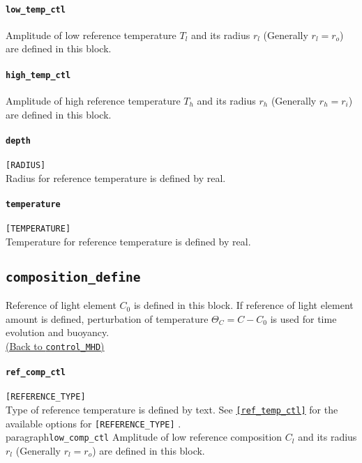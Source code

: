 \paragraph{\tt low\_temp\_ctl}
\label{href_t:low_temp_ctl}
Amplitude of low reference temperature $T_{l}$ and its radius $r_{l}$ (Generally $r_{l} = r_{o}$) are defined in this block.

\paragraph{\tt high\_temp\_ctl}
\label{href_t:high_temp_ctl}
Amplitude of high reference temperature $T_{h}$ and its radius $r_{h}$ (Generally $r_{h} = r_{i}$) are defined in this block.

\paragraph{\tt depth}
\label{href_t:depth}
\verb|[RADIUS]| \\
Radius for reference temperature is defined by real.

\paragraph{\tt temperature}
\label{href_t:temperature}
\verb|[TEMPERATURE]| \\
Temperature for reference temperature is defined by real.

\subsection{\tt composition\_define}
\label{href_t:composition_define}
Reference of light element $C_{0}$ is defined in this block. If reference of light element amount is defined, perturbation of temperature $\Theta_{C} = C - C_{0}$ is used for time evolution and buoyancy. \\
\hyperref[href_i:composition_define]{(Back to {\tt control\_MHD})}

\paragraph{\tt ref\_comp\_ctl}
\label{href_t:ref_comp_ctl}
\verb|[REFERENCE_TYPE]| \\
Type of reference temperature is defined by text. See  \hyperref[href_t:ref_temp_ctl]{\tt [ref\_temp\_ctl]} for the available options for \verb|[REFERENCE_TYPE]| .
%
\\paragraph{\tt low\_comp\_ctl}
\label{href_t:low_comp_ctl}
Amplitude of low reference composition $C_{l}$ and its radius $r_{l}$ (Generally $r_{l} = r_{o}$) are defined in this block.

